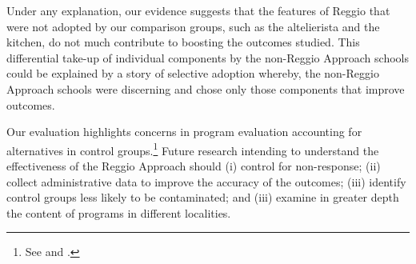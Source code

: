 Under any explanation, our evidence suggests that the features of Reggio that were not adopted by our comparison groups, such as the altelierista and the kitchen, do not much contribute to boosting the outcomes studied. This differential take-up of individual components by the non-Reggio Approach schools could be explained by a story of selective adoption whereby, the non-Reggio Approach schools were discerning and chose only those components that improve outcomes.

Our evaluation highlights concerns in program evaluation accounting for alternatives in control groups.\footnote{See \cite{Heckman_Hohmann_etal_2000_QJE} and \cite{Kline_Walters_2016_QJE}.} Future research intending to understand the effectiveness of the Reggio Approach should (i) control for non-response; (ii) collect administrative data to improve the accuracy of the outcomes; (iii) identify control groups less likely to be contaminated; and (iii) examine in greater depth the content of programs in different localities.




